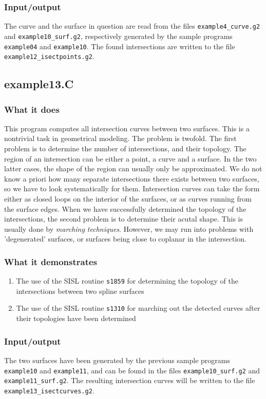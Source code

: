 \subsubsection{Input/output}
The curve and the surface in question are read from the files \verb/example4_curve.g2/ 
and \verb/example10_surf.g2/, respectively generated by the sample programs
\verb/example04/ and \verb/example10/.  The found intersections are written to
the file \\
\verb/example12_isectpoints.g2/.

\subsection{example13.C}

\subsubsection{What it does}
This program computes all intersection curves between two surfaces.  This is a nontrivial
task in geometrical modeling.  The problem is twofold.  The first problem is to determine
the number of intersections, and their topology. The region of an intersection can be either
a point, a curve and a surface.  In the two latter cases, the shape of the region can usually
only be approximated.  We do not know a priori how many separate intersections there exists
between two surfaces, so we have to look systematically for them.  Intersection curves can
take the form either as closed loops on the interior of the surfaces, or as curves running
from the surface edges.  When we have successfully determined the topology of the intersections,
the second problem is to determine their acutal shape.  This is usually done by \emph{marching
techniques}.  However, we may run into problems with 'degenerated' surfaces, or surfaces being 
close to coplanar in the intersection.
\subsubsection{What it demonstrates}
\begin{enumerate}
\item The use of the SISL routine \verb/s1859/ for determining the topology of the intersections
between two spline surfaces
\item The use of the SISL routine \verb/s1310/ for marching out the detected curves after their
topologies have been determined
\end{enumerate}
\subsubsection{Input/output}
The two surfaces have been generated by the previous sample programs \verb/example10/ and 
\verb/example11/, and can be found in the files \verb/example10_surf.g2/ and \\
\verb/example11_surf.g2/.  The resulting intersection curves will be written to the file
\verb/example13_isectcurves.g2/.

